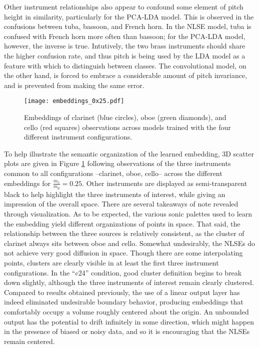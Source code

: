 Other instrument relationships also appear to confound some element of pitch height in similarity, particularly for the PCA-LDA model.
This is observed in the confusions between tuba, bassoon, and French horn.
In the NLSE model, tuba is confused with French horn more often than bassoon; for the PCA-LDA model, however, the inverse is true.
Intutively, the two brass instruments should share the higher confusion rate, and thus pitch is being used by the LDA model as a feature with which to distinguish between classes.
The convolutional model, on the other hand, is forced to embrace a considerable amount of pitch invariance, and is prevented from making the same error.

\begin{figure}[h]
\centering
\texttt{[image: embeddings\_0x25.pdf]}
\caption{Embeddings of clarinet (blue circles), oboe (green diamonds), and cello (red squares) observations across models trained with the four different instrument configurations.}
\label{fig:embeddings_0x25}
\end{figure}

To help illustrate the semantic organization of the learned embedding, 3D scatter plots are given in Figure \ref{fig:embeddings_0x25} following observations of the three instruments common to all configurations --clarinet, oboe, cello-- across the different embeddings for $\frac{m_s}{m_d} = 0.25$.
Other instruments are displayed as semi-transparent black to help highlight the three instruments of interest, while giving an impression of the overall space.
There are several takeaways of note revealed through visualization.
As to be expected, the various sonic palettes used to learn the embedding yield different organizations of points in space.
That said, the relationship between the three sources is relatively consistent, as the cluster of clarinet always sits between oboe and cello.
Somewhat undesirably, the NLSEs do not achieve very good diffusion in space.
Though there are some interpolating points, clusters are clearly visible in at least the first three instrument configurations.
In the ``c24'' condition, good cluster definition begins to break down slightly, although the three instruments of interest remain clearly clustered.
Compared to results obtained previously, the use of a linear output layer has indeed eliminated undesirable boundary behavior, producing embeddings that comfortably occupy a volume roughly centered about the origin.
An unbounded output has the potential to drift infinitely in some direction, which might happen in the presence of biased or noisy data, and so it is encouraging that the NLSEs remain centered.


